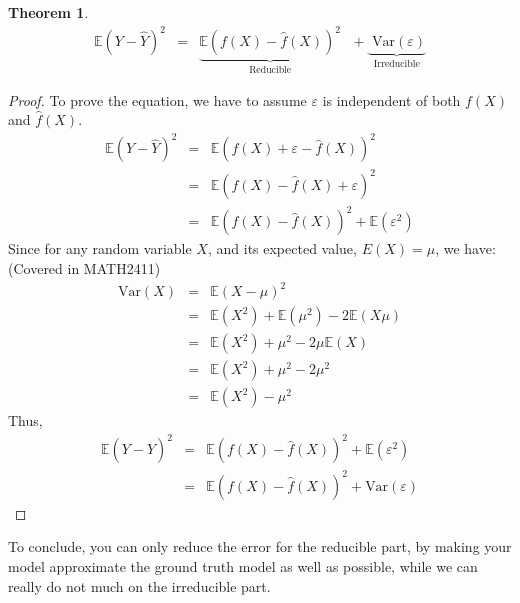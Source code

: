 \documentclass{article}
\theoremstyle{MyNonumberplain}
\theoremstyle{break}
\newtheorem*{proof}{Proof. }
\newcommand{\ev}{\mathbb{E}}
\newcommand{\var}{\text{Var}}
\theoremstyle{break}
\newtheorem{theorem}{Theorem}[section]
\theoremstyle{break}
\theoremstyle{break}
\begin{document}
\begin{thmbox}
    \begin{theorem}
    \begin{eqnarray*}
        \ev(Y-\hat{Y})^2 & = & \underbrace{\ev(f(X)-\hat{f}(X))^2}_{\text{Reducible}} \text{ } + \underbrace{\text{ Var}(\varepsilon)}_{\text{Irreducible}}
    \end{eqnarray*}
    \end{theorem}
    \begin{prfbox}
        \begin{proof}
            {To prove the equation, we have to assume $\varepsilon$ is independent of both $f(X)$ and $\hat{f}(X)$.}
            \begin{eqnarray*}
                \ev(Y-\hat{Y})^2 & = & \ev(f(X)+\varepsilon-\hat{f}(X))^2 \\
                                        & = & \ev(f(X)-\hat{f}(X)+\varepsilon)^2 \\
                                        & = & \ev(f(X)-\hat{f}(X))^2+\ev(\varepsilon^2)
            \end{eqnarray*}
            Since for any random variable $X$, and its expected value, $E(X)=\mu$, we have: (Covered in MATH2411)
            \begin{eqnarray*}
                \text{Var}(X) & = & \ev(X-\mu)^2\\
                              & = & \ev(X^2)+\ev(\mu^2)-2\ev(X\mu)\\
                              & = & \ev(X^2)+\mu^2-2\mu\ev(X)\\
                              & = & \ev(X^2)+\mu^2-2\mu^2\\
                              & = & \ev(X^2)-\mu^2
            \end{eqnarray*}
            Thus, 
            \begin{eqnarray*}
                \ev(Y-\hat{Y})^2 & = & \ev(f(X)-\hat{f}(X))^2+\ev(\varepsilon^2) \\
                                 & = & \ev(f(X)-\hat{f}(X))^2+\var(\varepsilon)
            \end{eqnarray*}
        \end{proof}
    \end{prfbox}
\end{thmbox}

To conclude, you can only reduce the error for the reducible part, by making your model approximate the ground truth model as well as possible, 
while we can really do not much on the irreducible part.
\end{document}
